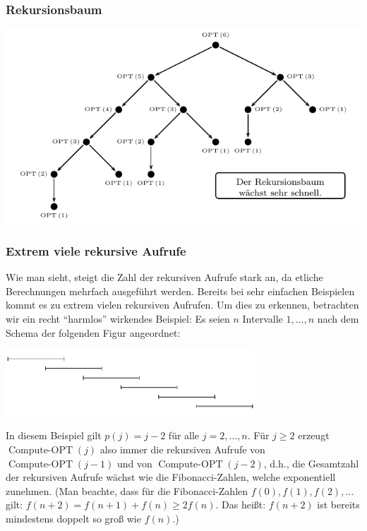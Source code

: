 \documentclass[smaller]{beamer}
\DeclareMathOperator{\copt}{Compute-OPT}
\begin{document}
\begin{frame}
 \frametitle{Rekursionsbaum}
 \begin{center}
\includegraphics{fig89.pdf}
\end{center}
\end{frame}

\begin{frame}
 \frametitle{Extrem viele rekursive Aufrufe}
 Wie man sieht, steigt die Zahl der rekursiven Aufrufe stark an, da etliche Berechnungen mehrfach ausgeführt werden. \alert{Bereits bei sehr einfachen Beispielen kommt es zu extrem vielen rekursiven Aufrufen}. Um dies zu erkennen, betrachten wir ein recht \enquote{harmlos} wirkendes Beispiel: Es seien $n$ Intervalle $1,\ldots,n$ nach dem Schema der folgenden Figur angeordnet:

\begin{center}
 \includegraphics[width=0.7\textwidth]{fig90.pdf}
\end{center}

In diesem Beispiel gilt $p(j) = j-2$ für alle $j = 2,\ldots,n$. Für $j \geq 2$ erzeugt $\copt{(j)}$ also immer die rekursiven Aufrufe von $\copt{(j-1)}$ und von $\copt{(j-2)}$, d.h., die Gesamtzahl der rekursiven Aufrufe wächst wie die Fibonacci-Zahlen, welche \alert{exponentiell zunehmen.} (Man beachte, dass für die Fibonacci-Zahlen $f(0), f(1), f(2), \ldots$ gilt: $f(n+2) = f(n+1) + f(n) \geq 2f(n)$. Das heißt: $f(n+2)$ ist bereits mindestens doppelt so groß wie $f(n)$.)
\end{frame}
\end{document}
